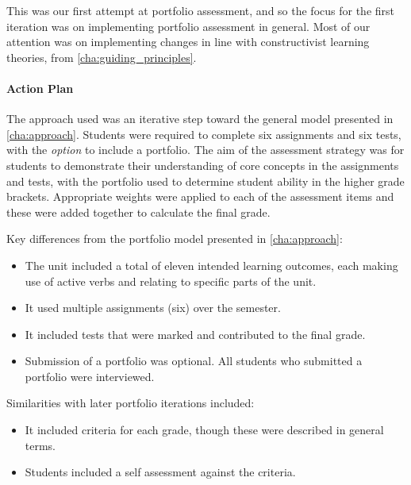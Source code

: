 This was our first attempt at portfolio assessment, and so the focus for the first iteration was on implementing portfolio assessment in general. Most of our attention was on implementing changes in line with constructivist learning theories,  from \cref{cha:guiding_principles}.

\paragraph{Action Plan} %

The approach used was an iterative step toward the general model presented in \cref{cha:approach}. Students were required to complete six assignments and six tests, with the \emph{option} to include a portfolio. The aim of the assessment strategy was for students to demonstrate their understanding of core concepts in the assignments and tests, with the portfolio used to determine student ability in the higher grade brackets. Appropriate weights were applied to each of the assessment items and these were added together to calculate the final grade.

Key differences from the portfolio model presented in \cref{cha:approach}:
\begin{itemize}[noitemsep,nolistsep]
  \item The unit included a total of eleven intended learning outcomes, each making use of active verbs and relating to specific parts of the unit.
  \item It used multiple assignments (six) over the semester.
  \item It included tests that were marked and contributed to the final grade.
  \item Submission of a portfolio was optional.  All students who submitted a portfolio were interviewed.
\end{itemize}

Similarities with later portfolio iterations included:
\begin{itemize}[noitemsep,nolistsep]
  \item It included criteria for each grade, though these were described in general terms.
  \item Students included a self assessment against the criteria.
\end{itemize}

